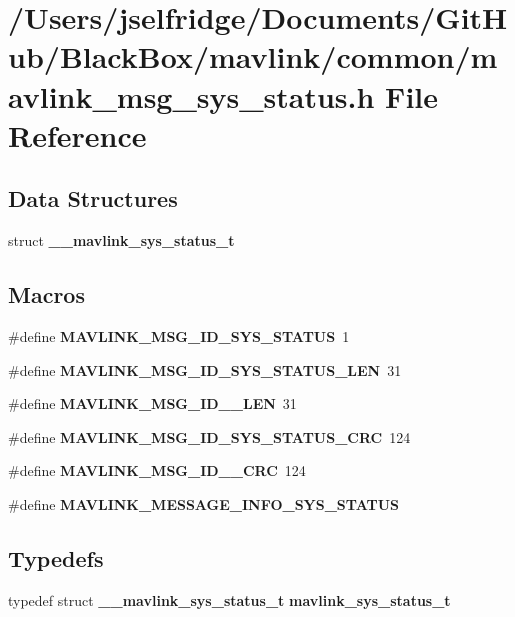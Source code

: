 \section{/\+Users/jselfridge/\+Documents/\+Git\+Hub/\+Black\+Box/mavlink/common/mavlink\+\_\+msg\+\_\+sys\+\_\+status.h File Reference}
\label{mavlink__msg__sys__status_8h}
\subsection*{Data Structures}
\begin{DoxyCompactItemize}
\item 
struct \textbf{ \+\_\+\+\_\+mavlink\+\_\+sys\+\_\+status\+\_\+t}
\end{DoxyCompactItemize}
\subsection*{Macros}
\begin{DoxyCompactItemize}
\item 
\#define \textbf{ M\+A\+V\+L\+I\+N\+K\+\_\+\+M\+S\+G\+\_\+\+I\+D\+\_\+\+S\+Y\+S\+\_\+\+S\+T\+A\+T\+US}~1
\item 
\#define \textbf{ M\+A\+V\+L\+I\+N\+K\+\_\+\+M\+S\+G\+\_\+\+I\+D\+\_\+\+S\+Y\+S\+\_\+\+S\+T\+A\+T\+U\+S\+\_\+\+L\+EN}~31
\item 
\#define \textbf{ M\+A\+V\+L\+I\+N\+K\+\_\+\+M\+S\+G\+\_\+\+I\+D\+\_\+\_\+\+L\+EN}~31
\item 
\#define \textbf{ M\+A\+V\+L\+I\+N\+K\+\_\+\+M\+S\+G\+\_\+\+I\+D\+\_\+\+S\+Y\+S\+\_\+\+S\+T\+A\+T\+U\+S\+\_\+\+C\+RC}~124
\item 
\#define \textbf{ M\+A\+V\+L\+I\+N\+K\+\_\+\+M\+S\+G\+\_\+\+I\+D\+\_\+\_\+\+C\+RC}~124
\item 
\#define \textbf{ M\+A\+V\+L\+I\+N\+K\+\_\+\+M\+E\+S\+S\+A\+G\+E\+\_\+\+I\+N\+F\+O\+\_\+\+S\+Y\+S\+\_\+\+S\+T\+A\+T\+US}
\end{DoxyCompactItemize}
\subsection*{Typedefs}
\begin{DoxyCompactItemize}
\item 
typedef struct \textbf{ \+\_\+\+\_\+mavlink\+\_\+sys\+\_\+status\+\_\+t} \textbf{ mavlink\+\_\+sys\+\_\+status\+\_\+t}
\end{DoxyCompactItemize}


